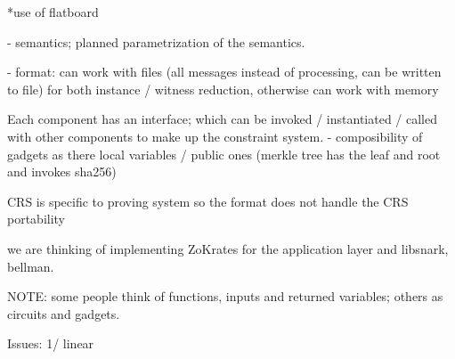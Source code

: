 		*use of flatboard
		
		- semantics; planned parametrization of the semantics.
		
		- format: can work with files (all messages instead of processing, can be written to file) for both instance / witness reduction, otherwise can work with memory 
		
		Each component has an interface; which can be invoked / instantiated / called with other components to make up the constraint system.
			- composibility of gadgets as there local variables / public ones (merkle tree has the leaf and root and invokes sha256)
		
		CRS is specific to proving system so the format does not handle the CRS portability
		
		we are thinking of implementing ZoKrates for the application layer and libsnark, bellman.  
		
		NOTE: some people think of functions, inputs and returned variables; others as circuits and gadgets.
		
		
		Issues: 1/ linear 